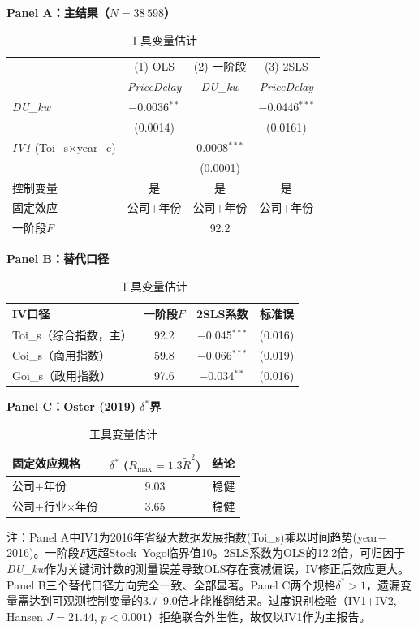 \documentclass[11pt,a4paper]{article}
\newcommand{\hei}{\CJKfamily{hei}\bfseries}
\begin{document}
\begin{table}[htbp]
\centering
\caption{工具变量估计}
\label{tab:iv}
\small

\vspace{4pt}
{\hei Panel A：主结果（$N=38\,598$）}
\vspace{4pt}

\begin{tabular}{l*{3}{c}}
\toprule
 & (1) OLS & (2) 一阶段 & (3) 2SLS \\
 & \textit{PriceDelay} & \textit{DU\_kw} & \textit{PriceDelay} \\
\midrule
\textit{DU\_kw}
 & $-$0.0036$^{**}$ & & $-$0.0446$^{***}$ \\
 & (0.0014) & & (0.0161) \\[4pt]
\textit{IV1} (Toi\_s$\times$year\_c)
 & & 0.0008$^{***}$ & \\
 & & (0.0001) & \\[4pt]
\midrule
控制变量 & 是 & 是 & 是 \\
固定效应 & 公司+年份 & 公司+年份 & 公司+年份 \\
一阶段$F$ & & 92.2 & \\
\bottomrule
\end{tabular}

\vspace{14pt}
{\hei Panel B：替代口径}
\vspace{4pt}

\begin{tabular}{lccc}
\toprule
IV口径 & 一阶段$F$ & 2SLS系数 & 标准误 \\
\midrule
Toi\_s（综合指数，主） & 92.2 & $-$0.045$^{***}$ & (0.016) \\
Coi\_s（商用指数） & 59.8 & $-$0.066$^{***}$ & (0.019) \\
Goi\_s（政用指数） & 97.6 & $-$0.034$^{**}$ & (0.016) \\
\bottomrule
\end{tabular}

\vspace{14pt}
{\hei Panel C：Oster (2019) $\delta^*$界}
\vspace{4pt}

\begin{tabular}{lcc}
\toprule
固定效应规格 & $\delta^*$ ($R_{\max}=1.3\tilde{R}^2$) & 结论 \\
\midrule
公司+年份 & 9.03 & 稳健 \\
公司+行业$\times$年份 & 3.65 & 稳健 \\
\bottomrule
\end{tabular}

\vspace{6pt}
{\footnotesize 注：Panel A中IV1为2016年省级大数据发展指数(Toi\_s)乘以时间趋势(year$-$2016)。一阶段$F$远超Stock--Yogo临界值10。2SLS系数为OLS的12.2倍，可归因于\textit{DU\_kw}作为关键词计数的测量误差导致OLS存在衰减偏误，IV修正后效应更大。Panel B三个替代口径方向完全一致、全部显著。Panel C两个规格$\delta^*>1$，遗漏变量需达到可观测控制变量的3.7--9.0倍才能推翻结果。过度识别检验（IV1+IV2, Hansen $J=21.44$, $p<0.001$）拒绝联合外生性，故仅以IV1作为主报告。}
\end{table}
\end{document}
